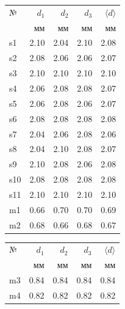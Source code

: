 \documentclass[a4paper, 12pt]{article}
\begin{document}
\begin{table}[h!]
    \vspace{5pt}
    \begin{center}
        \subtable
        {
            \begin{tabular}{|l|rrr|r|}
                \hline
                №   & $d_1$ & $d_2$ & $d_3$ & $\langle d \rangle$ \\
                    & мм    & мм    & мм    & мм                  \\
                \hline
                s1  & 2.10  & 2.04  & 2.10  & 2.08                \\
                s2  & 2.08  & 2.06  & 2.06  & 2.07                \\
                s3  & 2.10  & 2.10  & 2.10  & 2.10                \\
                s4  & 2.06  & 2.08  & 2.08  & 2.07                \\
                s5  & 2.06  & 2.08  & 2.06  & 2.07                \\
                s6  & 2.08  & 2.08  & 2.08  & 2.08                \\
                s7  & 2.04  & 2.06  & 2.08  & 2.06                \\
                s8  & 2.04  & 2.10  & 2.08  & 2.07                \\
                s9  & 2.10  & 2.08  & 2.06  & 2.08                \\
                s10 & 2.08  & 2.08  & 2.08  & 2.08                \\
                s11 & 2.10  & 2.10  & 2.10  & 2.10                \\
                m1  & 0.66  & 0.70  & 0.70  & 0.69                \\
                m2  & 0.68  & 0.66  & 0.68  & 0.67                \\
                \hline
            \end{tabular}
        }
        \subtable
        {
            \begin{tabular}{|l|rrr|r|}
                \hline
                №   & $d_1$ & $d_2$ & $d_3$ & $\langle d \rangle$ \\
                    & мм    & мм    & мм    & мм                  \\
                \hline
                m3  & 0.84  & 0.84  & 0.84  & 0.84                \\
                m4  & 0.82  & 0.82  & 0.82  & 0.82                \\

\end{tabular}}
\end{center}
\end{table}
\end{document}

